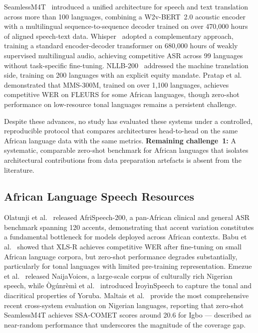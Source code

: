 \documentclass[10pt,twocolumn]{article}
\begin{document}
SeamlessM4T~\cite{barrault2023seamless} introduced a unified
architecture for speech and text translation across more than
100 languages, combining a W2v-BERT~2.0 acoustic encoder with
a multilingual sequence-to-sequence decoder trained on over
470,000 hours of aligned speech-text data.
Whisper~\cite{radford2022whisper} adopted a complementary
approach, training a standard encoder-decoder transformer on
680,000 hours of weakly supervised multilingual audio,
achieving competitive ASR across 99 languages without
task-specific fine-tuning.
NLLB-200~\cite{nllb2022} addressed the machine translation side,
training on 200 languages with an explicit equity mandate.
Pratap et al.~\cite{pratap2023mms} demonstrated that MMS-300M,
trained on over 1,100 languages, achieves competitive WER on
FLEURS for some African languages, though zero-shot performance
on low-resource tonal languages remains a persistent challenge.

Despite these advances, no study has evaluated these systems
under a controlled, reproducible protocol that compares
architectures head-to-head on the same African language data
with the same metrics.
\textbf{Remaining challenge~1:} A systematic, comparable
zero-shot benchmark for African languages that isolates
architectural contributions from data preparation artefacts
is absent from the literature.

\subsection{African Language Speech Resources}

Olatunji et al.~\cite{olatunji2023afrispeech} released
AfriSpeech-200, a pan-African clinical and general ASR
benchmark spanning 120 accents, demonstrating that accent
variation constitutes a fundamental bottleneck for models
deployed across African contexts.
Babu et al.~\cite{babu2022xlsr} showed that XLS-R achieves
competitive WER after fine-tuning on small African language
corpora, but zero-shot performance degrades substantially,
particularly for tonal languages with limited pre-training
representation.
Emezue et al.~\cite{emezue2025naijavoices} released NaijaVoices,
a large-scale corpus of culturally rich Nigerian speech, while
\`{O}g\'{u}nr\`{e}m\`{i} et
al.~\cite{ogunremi2024iroyinspeech} introduced
\`{I}roy\`{i}nSpeech to capture the tonal and diacritical
properties of Yoruba.
Maltais et al.~\cite{maltais2026naijas2st} provide the most
comprehensive recent cross-system evaluation on Nigerian
languages, reporting that zero-shot SeamlessM4T achieves
SSA-COMET scores around 20.6 for Igbo --- described as
near-random performance that underscores the magnitude of
the coverage gap.
\end{document}
